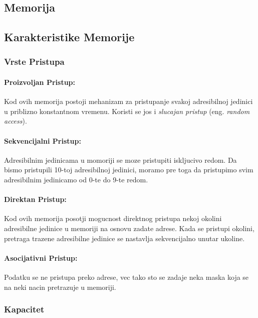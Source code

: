 \documentclass[12p,a4paper]{article}
\begin{document}
\begin{multicols}{2}
    \section{Memorija}

    \subsection{Karakteristike Memorije}

    \subsubsection{Vrste Pristupa}

    \paragraph{Proizvoljan Pristup:}
    Kod ovih memorija postoji mehanizam za pristupanje svakoj adresibilnoj
    jedinici u priblizno konstantnom vremenu. Koristi se jos i
    \emph{slucajan pristup} (eng. \emph{random access}). 

    \paragraph{Sekvencijalni Pristup:} 
    Adresibilnim jedinicama u momoriji se moze pristupiti iskljucivo redom. Da 
    bismo pristupili 10-toj adresibilnoj jedinici, moramo pre toga da 
    pristupimo svim adresibilnim jedinicamo od 0-te do 9-te redom.

    \paragraph{Direktan Pristup:} 
    Kod ovih memorija posotji mogucnost direktnog pristupa nekoj okolini
    adresibilne jedinice u memoriji na osnovu zadate adrese. Kada se pristupi
    okolini, pretraga trazene adresibilne jedinice se nastavlja sekvencijalno 
    unutar ukoline.

    \paragraph{Asocijativni Pristup:}
    Podatku se ne pristupa preko adrese, vec tako sto se zadaje neka maska
    koja se na neki nacin pretrazuje u memoriji.

    \subsubsection{Kapacitet}


\end{multicols}
\end{document}
